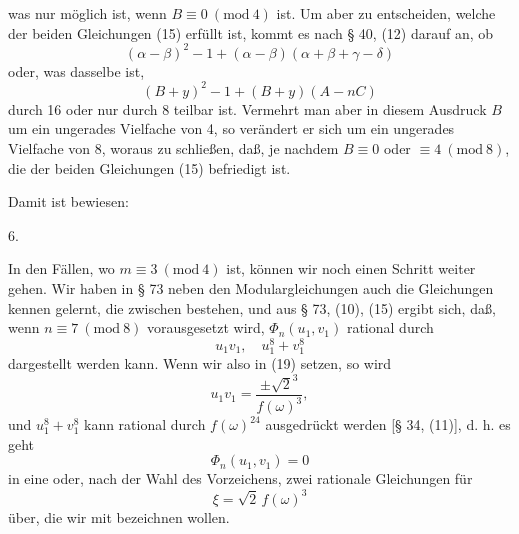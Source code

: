 
was nur möglich ist, wenn $B \equiv 0\ (\mathrm{mod}\ 4)$ ist. Um aber zu entscheiden, welche der beiden Gleichungen (15) erfüllt ist, kommt es nach § 40, (12) darauf an, ob
\[
(\alpha - \beta)^2 - 1 + (\alpha - \beta)(\alpha + \beta + \gamma - \delta)
\]
oder, was dasselbe ist,
\[
(B+y)^2 - 1 + (B+y)(A - nC)
\]
durch 16 oder nur durch 8 teilbar ist. Vermehrt man aber in diesem Ausdruck $B$ um ein ungerades Vielfache von 4, so verändert er sich um ein ungerades Vielfache von 8, woraus zu schließen, daß, je nachdem $B \equiv 0$ oder $\equiv 4\ (\mathrm{mod}\ 8)$, die  der beiden Gleichungen (15) befriedigt ist. %

Damit ist bewiesen:

6. 

In den Fällen, wo $m \equiv 3\ (\mathrm{mod}\ 4)$ ist, können wir noch einen Schritt weiter gehen. Wir haben in § 73 neben den  Modulargleichungen auch die Gleichungen
kennen gelernt, die zwischen
bestehen, und aus § 73, (10), (15) ergibt sich, daß, wenn $n \equiv 7\ (\mathrm{mod}\ 8)$ vorausgesetzt wird, $\Phi_n(u_1, v_1)$ rational durch
\[
u_1 v_1, \quad u_1^8 + v_1^8
\]
dargestellt werden kann. Wenn wir also in (19)
setzen, so wird
\[
u_1 v_1 = \frac{\pm \sqrt{2}^{3}}{f(\omega)^3},
\]
und $u_1^8 + v_1^8$ kann rational durch $f(\omega)^{24}$ ausgedrückt werden [§ 34, (11)], d. h. es geht
\[
\Phi_n(u_1, v_1) = 0
\]
in eine oder, nach der Wahl des Vorzeichens, zwei rationale Gleichungen für
\[
\xi = \sqrt{2}\, f(\omega)^3
\]
über, die wir mit
bezeichnen wollen.

